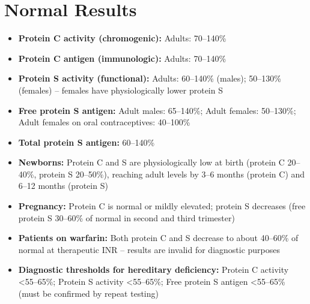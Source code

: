 \section*{Normal Results}
\begin{itemize}
  \item \textbf{Protein C activity (chromogenic):} Adults: 70--140\%
  \item \textbf{Protein C antigen (immunologic):} Adults: 70--140\%
  \item \textbf{Protein S activity (functional):} Adults: 60--140\% (males); 50--130\% (females) -- females have physiologically lower protein S
  \item \textbf{Free protein S antigen:} Adult males: 65--140\%; Adult females: 50--130\%; Adult females on oral contraceptives: 40--100\%
  \item \textbf{Total protein S antigen:} 60--140\%
  \item \textbf{Newborns:} Protein C and S are physiologically low at birth (protein C 20--40\%, protein S 20--50\%), reaching adult levels by 3--6 months (protein C) and 6--12 months (protein S)
  \item \textbf{Pregnancy:} Protein C is normal or mildly elevated; protein S decreases (free protein S 30--60\% of normal in second and third trimester)
  \item \textbf{Patients on warfarin:} Both protein C and S decrease to about 40--60\% of normal at therapeutic INR -- results are invalid for diagnostic purposes
  \item \textbf{Diagnostic thresholds for hereditary deficiency:} Protein C activity <55--65\%; Protein S activity <55--65\%; Free protein S antigen <55--65\% (must be confirmed by repeat testing) \cite{wallach2022interpretation}
\end{itemize}

